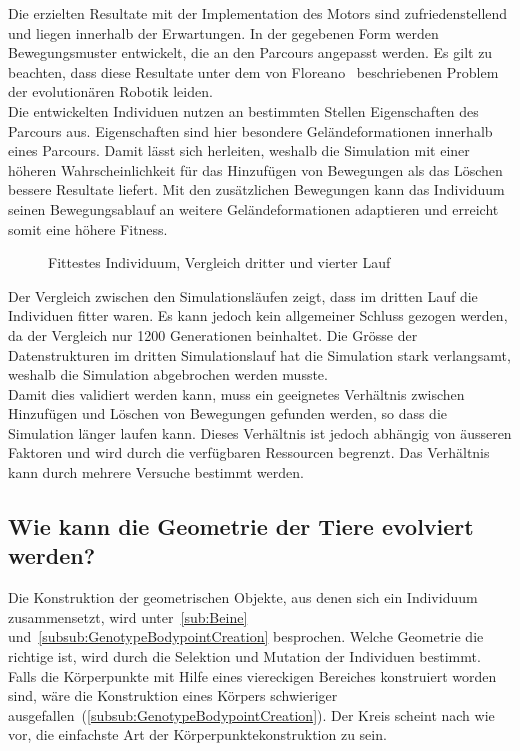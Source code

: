       \medskip

      Die erzielten Resultate mit der Implementation des Motors sind zufriedenstellend und
      liegen innerhalb der Erwartungen.
      In der gegebenen Form werden Bewegungsmuster entwickelt, die an den Parcours angepasst werden.
      Es gilt zu beachten, dass diese Resultate unter dem von Floreano~\cite{Floreano2010} beschriebenen Problem
      der evolutionären Robotik leiden.
      \\
      Die entwickelten Individuen nutzen an bestimmten Stellen Eigenschaften des Parcours aus.
      Eigenschaften sind hier besondere Geländeformationen innerhalb eines Parcours.
      Damit lässt sich herleiten, weshalb die Simulation mit einer höheren Wahrscheinlichkeit
      für das Hinzufügen von Bewegungen als das Löschen bessere Resultate liefert.
      Mit den zusätzlichen Bewegungen kann das Individuum seinen Bewegungsablauf
      an weitere Geländeformationen adaptieren und erreicht somit eine höhere Fitness.

      \begin{figure}[H]
        \centering
        
        \caption{Fittestes Individuum, Vergleich dritter und vierter Lauf}
      \end{figure}

      Der Vergleich zwischen den Simulationsläufen zeigt, dass im dritten Lauf die Individuen fitter waren.
      Es kann jedoch kein allgemeiner Schluss gezogen werden, da der Vergleich nur 1200 Generationen beinhaltet.
      Die Grösse der Datenstrukturen im dritten Simulationslauf hat die Simulation stark verlangsamt,
      weshalb die Simulation abgebrochen werden musste.
      \\
      Damit dies validiert werden kann,
      muss ein geeignetes Verhältnis zwischen Hinzufügen und Löschen von Bewegungen gefunden werden,
      so dass die Simulation länger laufen kann.
      Dieses Verhältnis ist jedoch abhängig von äusseren Faktoren und wird durch die verfügbaren Ressourcen begrenzt.
      Das Verhältnis kann durch mehrere Versuche bestimmt werden.

    \subsection{Wie kann die Geometrie der Tiere evolviert werden?}

      Die Konstruktion der geometrischen Objekte, aus denen sich ein Individuum zusammensetzt,
      wird unter~\vref{sub:Beine} und~\vref{subsub:GenotypeBodypointCreation} besprochen.
      Welche Geometrie die richtige ist, wird durch die Selektion und Mutation der Individuen bestimmt.
      Falls die Körperpunkte mit Hilfe eines viereckigen Bereiches konstruiert worden sind,
      wäre die Konstruktion eines Körpers schwieriger ausgefallen~(\vref{subsub:GenotypeBodypointCreation}).
      Der Kreis scheint nach wie vor, die einfachste Art der Körperpunktekonstruktion zu sein.

